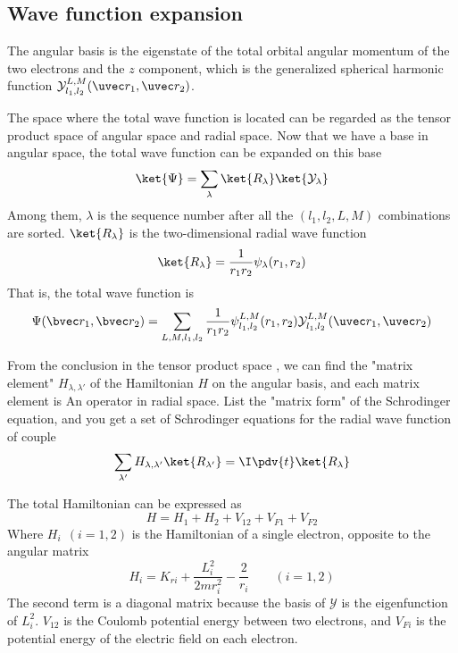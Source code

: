 


\subsection{Wave function expansion}
The angular basis is the eigenstate  of the total orbital angular momentum of the two electrons and the $z$ component, which is the generalized spherical harmonic function $\mathcal{Y}_{l_1,l_2}^{L,M} (\uvec r_1, \uvec r_2)$.

The space where the total wave function is located can be regarded as the tensor product space of angular space and radial space. Now that we have a base in angular space, the total wave function can be expanded on this base
\begin{equation}
\ket{\Psi} = \sum_\lambda \ket{R_\lambda}\ket{\mathcal{Y_\lambda}}
\end{equation}
Among them, $\lambda$ is the sequence number after all the $(l_1,l_2,L,M)$ combinations are sorted. $\ket{R_\lambda}$ is the two-dimensional radial wave function
\begin{equation}
\ket{R_\lambda} = \frac{1}{r_1 r_2} \psi_\lambda(r_1, r_2)
\end{equation}
That is, the total wave function is
\begin{equation}\label{test3_eq2}
\Psi(\bvec r_1, \bvec r_2) = \sum_{L, M, l_1, l_2} \frac{1}{r_1 r_2} \psi_{l_1, l_2}^{L, M}(r_1, r_2) \mathcal{Y}_{l_1, l_2}^{L, M}(\uvec r_1, \uvec r_2)
\end{equation}

From the conclusion in the tensor product space  , we can find the "matrix element" $H_{\lambda, \lambda'}$ of the Hamiltonian $H$ on the angular basis, and each matrix element is An operator in radial space. List the "matrix form" of the Schrodinger equation, and you get a set of Schrodinger equations for the radial wave function of couple
\begin{equation}
\sum_{\lambda'} H_{\lambda, \lambda'} \ket{R_{\lambda'}} = \I \pdv{t} \ket{R_{\lambda}}
\end{equation}

The total Hamiltonian can be expressed as
\begin{equation}
H = H_1 + H_2 + V_{12} + V_{F1} + V_{F2}
\end{equation}
Where $H_i \ \ (i = 1, 2)$ is the Hamiltonian of a single electron, opposite to the angular matrix
\begin{equation}
H_i = K_{ri} + \frac{L_i^2}{2m r_i^2}-\frac{2}{r_i} \qquad (i = 1,2)
\end{equation}
The second term is a diagonal matrix because the basis of $\mathcal Y$ is the eigenfunction of $L_i^2$. $V_{12}$ is the Coulomb potential energy between two electrons, and $V_{Fi}$ is the potential energy of the electric field on each electron.

